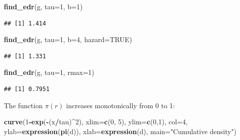 \documentclass[12pt,]{book}
\newenvironment{Shaded}{\begin{snugshade}}{\end{snugshade}}
\newcommand{\DataTypeTok}[1]{\textcolor[rgb]{0.13,0.29,0.53}{#1}}
\newcommand{\DecValTok}[1]{\textcolor[rgb]{0.00,0.00,0.81}{#1}}
\newcommand{\KeywordTok}[1]{\textcolor[rgb]{0.13,0.29,0.53}{\textbf{#1}}}
\newcommand{\NormalTok}[1]{#1}
\newcommand{\OperatorTok}[1]{\textcolor[rgb]{0.81,0.36,0.00}{\textbf{#1}}}
\newcommand{\OtherTok}[1]{\textcolor[rgb]{0.56,0.35,0.01}{#1}}
\newcommand{\StringTok}[1]{\textcolor[rgb]{0.31,0.60,0.02}{#1}}
\begin{document}
\begin{Shaded}
\begin{Highlighting}[]
\KeywordTok{find_edr}\NormalTok{(g, }\DataTypeTok{tau=}\DecValTok{1}\NormalTok{, }\DataTypeTok{b=}\DecValTok{1}\NormalTok{)}
\end{Highlighting}
\end{Shaded}

\begin{verbatim}
## [1] 1.414
\end{verbatim}

\begin{Shaded}
\begin{Highlighting}[]
\KeywordTok{find_edr}\NormalTok{(g, }\DataTypeTok{tau=}\DecValTok{1}\NormalTok{, }\DataTypeTok{b=}\DecValTok{4}\NormalTok{, }\DataTypeTok{hazard=}\OtherTok{TRUE}\NormalTok{)}
\end{Highlighting}
\end{Shaded}

\begin{verbatim}
## [1] 1.331
\end{verbatim}

\begin{Shaded}
\begin{Highlighting}[]
\KeywordTok{find_edr}\NormalTok{(g, }\DataTypeTok{tau=}\DecValTok{1}\NormalTok{, }\DataTypeTok{rmax=}\DecValTok{1}\NormalTok{)}
\end{Highlighting}
\end{Shaded}

\begin{verbatim}
## [1] 0.7951
\end{verbatim}

The function \(\pi(r)\) increases monotonically from 0 to 1:

\begin{Shaded}
\begin{Highlighting}[]
\KeywordTok{curve}\NormalTok{(}\DecValTok{1}\OperatorTok{-}\KeywordTok{exp}\NormalTok{(}\OperatorTok{-}\NormalTok{(x}\OperatorTok{/}\NormalTok{tau)}\OperatorTok{^}\DecValTok{2}\NormalTok{), }\DataTypeTok{xlim=}\KeywordTok{c}\NormalTok{(}\DecValTok{0}\NormalTok{, }\DecValTok{5}\NormalTok{), }\DataTypeTok{ylim=}\KeywordTok{c}\NormalTok{(}\DecValTok{0}\NormalTok{,}\DecValTok{1}\NormalTok{), }\DataTypeTok{col=}\DecValTok{4}\NormalTok{,}
  \DataTypeTok{ylab=}\KeywordTok{expression}\NormalTok{(}\KeywordTok{pi}\NormalTok{(d)), }\DataTypeTok{xlab=}\KeywordTok{expression}\NormalTok{(d), }
  \DataTypeTok{main=}\StringTok{"Cumulative density"}\NormalTok{)}
\end{Highlighting}
\end{Shaded}
\end{document}

